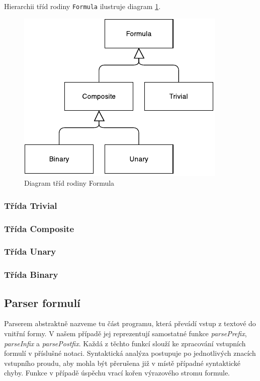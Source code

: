 \documentclass[thesis=B,czech,hidelinks]{thesis}[2012/06/26]
\begin{document}
Hierarchii tříd rodiny \texttt{Formula} ilustruje diagram \ref{fig:formula}.

\begin{figure}
\centering
\caption{Diagram tříd rodiny Formula}
\label{fig:formula}
\includegraphics[width=\linewidth]{diagrams/formula}
\end{figure}

\subsubsection{Třída Trivial}

\subsubsection{Třída Composite}

\subsubsection{Třída Unary}

\subsubsection{Třída Binary}

\subsection{Parser formulí}

Parserem abstraktně nazveme tu část programu, která převádí vstup z textové do vnitřní formy. V našem případě jej reprezentují samostatné funkce \emph{parsePrefix}, \emph{parseInfix} a \emph{parsePostfix}. Každá z těchto funkcí slouží ke zpracování vstupních formulí v příslušné notaci. Syntaktická analýza postupuje po jednotlivých znacích vstupního proudu, aby mohla být přerušena již v místě případné syntaktické chyby. Funkce v případě úspěchu vrací kořen výrazového stromu formule.
\end{document}
